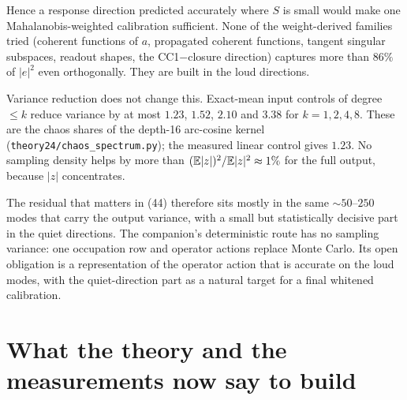 \begin{itemize}[leftmargin=1.5em]
Hence a response direction predicted accurately where $S$ is small would make one Mahalanobis-weighted calibration
sufficient. None of the weight-derived families tried (coherent functions of $a$, propagated coherent functions, tangent
singular subspaces, readout shapes, the CC1$-$closure direction) captures more than $86\%$ of $|e|^2$ even orthogonally.
They are built in the loud directions.

Variance reduction does not change this. Exact-mean input controls of degree $\le k$ reduce variance by at most $1.23$,
$1.52$, $2.10$ and $3.38$ for $k=1,2,4,8$. These are the chaos shares of the depth-16 arc-cosine kernel
(\texttt{theory24/chaos\_spectrum.py}); the measured linear control gives $1.23$. No sampling density helps by more than
$(\mathbb{E}|z|)^2/\mathbb{E}|z|^2\approx1\%$ for the full output, because $|z|$ concentrates.
\end{itemize}

The residual that matters in (44) therefore sits mostly in the same $\sim50$--$250$ modes that carry the output variance,
with a small but statistically decisive part in the quiet directions. The companion's deterministic route has no sampling
variance: one occupation row and operator actions replace Monte Carlo. Its open obligation is a representation of the
operator action that is accurate on the loud modes, with the quiet-direction part as a natural target for a final
whitened calibration.

\section{What the theory and the measurements now say to build}\label{sec:build}

